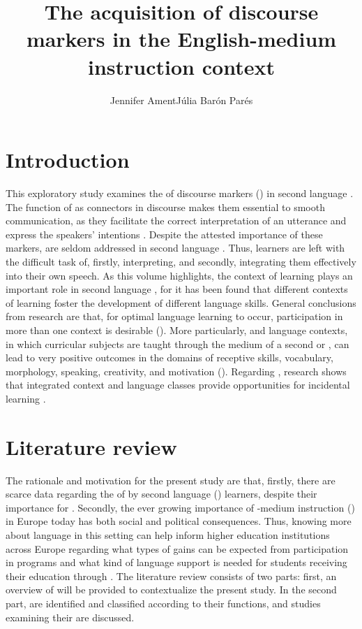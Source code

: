 \documentclass[output=paper]{langsci/langscibook}
\author{Jennifer Ament\affiliation{Universitat Pompeu Fabra}\lastand 	Júlia Barón Parés\affiliation{Universitat Internacional de Catalunya; Universitat de Barcelona}}
\title{The acquisition of discourse markers in the English-medium instruction context}
\begin{document}
   

\section{Introduction}

This exploratory study examines the  of discourse markers () in second language . The function of  as connectors in discourse makes them essential to smooth communication, as they facilitate the correct interpretation of an utterance and express the speakers’ intentions \citep{Ariel1998}. Despite the attested importance of these markers,  are seldom addressed in second language  \citep{Vellenga2004}. Thus, learners are left with the difficult task of, firstly, interpreting, and secondly, integrating them effectively into their own speech. As this volume highlights, the context of learning plays an important role in second language , for it has been found that different contexts of learning foster the development of different language skills. General conclusions from research are that, for optimal language learning to occur, participation in more than one context is desirable (\citealt{Pérez-Vidal2014}). More particularly,  and language contexts, in which curricular subjects are taught through the medium of a second or , can lead to very positive outcomes in the domains of receptive skills, vocabulary, morphology, speaking, creativity, and motivation (\citealt{Pérez-Cañado2012}). Regarding , research shows that integrated context and language classes provide opportunities for incidental  learning \citep{Taguchi2015contextually}.


\section{Literature review}

The rationale and motivation for the present study are that, firstly, there are scarce data regarding the  of  by second language () learners, despite their importance for . Secondly, the ever growing importance of -medium instruction () in Europe today has both social and political consequences. Thus, knowing more about language  in this setting can help inform higher education institutions across Europe regarding what types of  gains can be expected from participation in  programs and what kind of language support is needed for students receiving their education through . The literature review consists of two parts: first, an overview of  will be provided to contextualize the present study. In the second part,  are identified and classified according to their functions, and studies examining their  are discussed.
\end{document}
